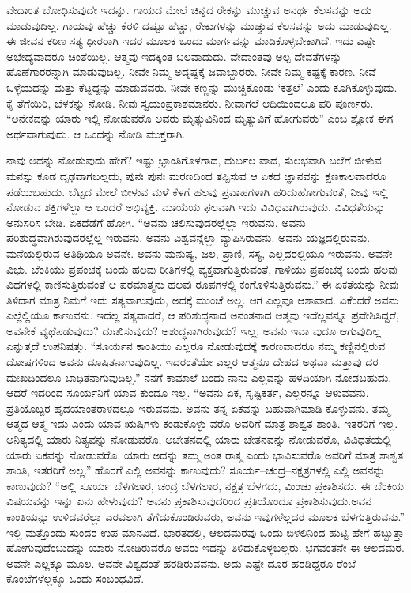 ವೇದಾಂತ ಬೋಧಿಸುವುದೇ ಇದನ್ನು. ಗಾಯದ ಮೇಲೆ ಚಿನ್ನದ ರೇಕನ್ನು ಮುಚ್ಚುವ ಅನರ್ಥ ಕೆಲಸವನ್ನು ಅದು ಮಾಡುವುದಿಲ್ಲ. ಗಾಯವು ಹೆಚ್ಚು ಕೆರಳಿ ದಷ್ಟೂ ಹೆಚ್ಚು, ರೇಕುಗಳನ್ನು ಮುಚ್ಚುವ ಕೆಲಸವನ್ನು ಅದು ಮಾಡುವುದಿಲ್ಲ. ಈ ಜೀವನ ಕಠಿಣ ಸತ್ಯ ಧೀರರಾಗಿ ಇದರ ಮೂಲಕ ಒಂದು ಮಾರ್ಗವನ್ನು ಮಾಡಿಕೊಳ್ಳಬೇಕಾಗಿದೆ. ಇದು ಎಷ್ಟೇ ಅಭೇದ್ಯವಾದರೂ ಚಿಂತೆಯಿಲ್ಲ. ಆತ್ಮವು ಇದಕ್ಕಿಂತ ಬಲವಾದುದು. ವೇದಾಂತವು ಅಲ್ಪ ದೇವತೆಗಳನ್ನು ಹೊಣೆಗಾರರನ್ನಾಗಿ ಮಾಡುವುದಿಲ್ಲ. ನೀವೇ ನಿಮ್ಮ ಅದೃಷ್ಟಕ್ಕೆ ಜವಾಬ್ದಾರರು. ನೀವೇ ನಿಮ್ಮ ಕಷ್ಟಕ್ಕೆ ಕಾರಣ. ನೀವೆ ಒಳ್ಳೆಯದನ್ನು ಮತ್ತು ಕೆಟ್ಟದ್ದನ್ನು ಮಾಡುವವರು. ನೀವೇ ಕಣ್ಣನ್ನು ಮುಚ್ಚಿಕೊಂಡು ‘ಕತ್ತಲೆ’ ಎಂದು ಕೂಗಿಕೊಳ್ಳುವುದು. ಕೈ ತೆಗೆಯಿರಿ, ಬೆಳಕನ್ನು ನೋಡಿ. ನೀವು ಸ್ವಯಂಪ್ರಕಾಶಮಾನರು. ನೀವಾಗಲೆ ಆದಿಯಿಂದಲೂ ಪರಿ ಪೂರ್ಣರು. “ಅನೇಕವನ್ನು ಯಾರು ಇಲ್ಲಿ ನೋಡುವರೊ ಅವರು ಮೃತ್ಯುವಿನಿಂದ ಮೃತ್ಯುವಿಗೆ ಹೋಗುವರು” ಎಂಬ ಶ್ಲೋಕ ಈಗ ಅರ್ಥವಾಗುವುದು. ಆ ಒಂದನ್ನು ನೋಡಿ ಮುಕ್ತರಾಗಿ.

ನಾವು ಅದನ್ನು ನೋಡುವುದು ಹೇಗೆ? ಇಷ್ಟು ಭ್ರಾಂತಿಗೊಳಗಾದ, ದುರ್ಬಲ ವಾದ, ಸುಲಭವಾಗಿ ಬಲೆಗೆ ಬೀಳುವ ಮನಸ್ಸು ಕೂಡ ದೃಢವಾಗಬಲ್ಲದು, ಪುನಃ ಪುನಃ ಮರಣದಿಂದ ತಪ್ಪಿಸುವ ಆ ಏಕದ ಜ್ಞಾನವನ್ನು ಕ್ಷಣಕಾಲವಾದರೂ ಪಡೆಯಬಹುದು. ಬೆಟ್ಟದ ಮೇಲೆ ಬೀಳುವ ಮಳೆ ಕೆಳಗೆ ಹಲವು ಪ್ರವಾಹಗಳಾಗಿ ಹರಿದುಹೋಗುವಂತೆ, ನೀವು ಇಲ್ಲಿ ನೋಡುವ ಶಕ್ತಿಗಳೆಲ್ಲಾ ಆ ಒಂದರೆ ಅಭಿವ್ಯಕ್ತಿ. ಮಾಯೆಯ ಫಲವಾಗಿ ಇದು ವಿವಿಧವಾಗಿರುವುದು. ವಿವಿಧತೆಯನ್ನು ಅನುಸರಿಸ ಬೇಡಿ. ಏಕದೆಡೆಗೆ ಹೋಗಿ. “ಅವನು ಚಲಿಸುವುದರಲ್ಲೆಲ್ಲಾ ಇರುವನು. ಅವನು ಪರಿಶುದ್ಧವಾಗಿರುವುದರಲ್ಲೆಲ್ಲ ಇರುವನು. ಅವನು ವಿಶ್ವವನ್ನೆಲ್ಲಾ ವ್ಯಾಪಿಸಿರುವನು. ಅವನು ಯಜ್ಞದಲ್ಲಿರುವನು. ಮನೆಯಲ್ಲಿರುವ ಅತಿಥಿಯೂ ಅವನೇ. ಅವನು ಮನುಷ್ಯ, ಜಲ, ಪ್ರಾಣಿ, ಸಸ್ಯ, ಎಲ್ಲದರಲ್ಲಿಯೂ ಇರುವನು. ಅವನೇ ವಿಭು. ಬೆಂಕಿಯು ಪ್ರಪಂಚಕ್ಕೆ ಬಂದು ಹಲವು ರೀತಿಗಳಲ್ಲಿ ವ್ಯಕ್ತವಾಗುತ್ತಿರುವಂತೆ, ಗಾಳಿಯು ಪ್ರಪಂಚಕ್ಕೆ ಬಂದು ಹಲವು ವಿಧಗಳಲ್ಲಿ ಕಾಣಿಸುತ್ತಿರುವಂತೆ ಆ ಪರಮಾತ್ಮನು ಹಲವು ರೂಪಗಳಲ್ಲಿ ಕಂಗೊಳಿಸುತ್ತಿರುವನು.” ಈ ಏಕತೆಯನ್ನು ನೀವು ತಿಳಿದಾಗ ಮಾತ್ರ ನಿಮಗೆ ಇದು ಸತ್ಯವಾಗುವುದು, ಅದಕ್ಕೆ ಮುಂಚೆ ಅಲ್ಲ. ಆಗ ಎಲ್ಲವೂ ಆಶಾವಾದ. ಏಕೆಂದರೆ ಅವನು ಎಲ್ಲೆಲ್ಲಿಯೂ ಕಾಣುವನು. ಇದೆಲ್ಲ ಸತ್ಯವಾದರೆ, ಆ ಪರಿಶುದ್ಧನಾದ ಅನಂತನಾದ ಆತ್ಮವು ಇದೆಲ್ಲವನ್ನೂ ಪ್ರವೇಶಿಸಿದ್ದರೆ, ಅವನೇಕೆ ವ್ಯಥೆಪಡುವುದು? ದುಃಖಿಸುವುದು? ಅಶುದ್ಧನಾಗಿರುವುದು? ಇಲ್ಲ, ಅವನು ಇವಾ ವುದೂ ಆಗುವುದಿಲ್ಲ ಎನ್ನುತ್ತದೆ ಉಪನಿಷತ್ತು. “ಸೂರ್ಯನ ಕಾಂತಿಯು ಎಲ್ಲರೂ ನೋಡುವುದಕ್ಕೆ ಕಾರಣವಾದರೂ ನಮ್ಮ ಕಣ್ಣಿನಲ್ಲಿರುವ ದೋಷಗಳಿಂದ ಅವನು ದೂಷಿತನಾಗುವುದಿಲ್ಲ. ಇದರಂತೆಯೇ ಎಲ್ಲರ ಆತ್ಮನೂ ದೇಹದ ಅಥವಾ ಮತ್ತಾವು ದರ ದುಃಖದಿಂದಲೂ ಬಾಧಿತನಾಗುವುದಿಲ್ಲ.” ನನಗೆ ಕಾಮಾಲೆ ಬಂದು ನಾನು ಎಲ್ಲವನ್ನು ಹಳದಿಯಾಗಿ ನೋಡಬಹುದು. ಆದರೆ ಇದರಿಂದ ಸೂರ್ಯನಿಗೆ ಯಾವ ಕುಂದೂ ಇಲ್ಲ. “ಅವನು ಏಕ, ಸೃಷ್ಟಿಕರ್ತ, ಎಲ್ಲರನ್ನೂ ಆಳುವವನು. ಪ್ರತಿಯೊಬ್ಬರ ಹೃದಯಾಂತರಾಳದಲ್ಲೂ ಇರುವವನು. ಅವನು ತನ್ನ ಏಕವನ್ನು ಬಹುವಾಗಿಮಾಡಿ ಕೊಳ್ಳುವನು. ತಮ್ಮ ಆತ್ಮದ ಆತ್ಮ ಇದು ಎಂದು ಯಾವ ಋಷಿಗಳು ಕಂಡುಕೊಳ್ಳು ವರೊ ಅವರಿಗೆ ಮಾತ್ರ ಶಾಶ್ವತ ಶಾಂತಿ. ಇತರರಿಗೆ ಇಲ್ಲ. ಅನಿತ್ಯದಲ್ಲಿ ಯಾರು ನಿತ್ಯವನ್ನು ನೋಡುವರೊ, ಅಚೇತನದಲ್ಲಿ ಯಾರು ಚೇತನವನ್ನು ನೋಡುವರೊ, ವಿವಿಧತೆಯಲ್ಲಿ ಯಾರು ಏಕವನ್ನು ನೋಡುವರೊ, ಯಾರು ಅದನ್ನು ತಮ್ಮ ಅಂತ ರಾತ್ಮ ಎಂದು ಭಾವಿಸುವರೊ ಅವರಿಗೆ ಮಾತ್ರ ಶಾಶ್ವತ ಶಾಂತಿ, ಇತರರಿಗೆ ಅಲ್ಲ.” ಹೊರಗೆ ಎಲ್ಲಿ ಅವನನ್ನು ಕಾಣುವುದು? ಸೂರ್ಯ–ಚಂದ್ರ–ನಕ್ಷತ್ರಗಳಲ್ಲಿ ಎಲ್ಲಿ ಅವನನ್ನು ಕಾಣುವುದು? “ಅಲ್ಲಿ ಸೂರ್ಯ ಬೆಳಗಲಾರ, ಚಂದ್ರ ಬೆಳಗಲಾರ, ನಕ್ಷತ್ರ ಬೆಳಗದು, ಮಿಂಚು ಪ್ರಕಾಶಿಸದು. ಈ ಬೆಂಕಿಯ ವಿಷಯವನ್ನು ಇನ್ನು ಏನು ಹೇಳುವುದು? ಅವನು ಪ್ರಕಾಶಿಸುವುದರಿಂದ ಪ್ರತಿಯೊಂದೂ ಪ್ರಕಾಶಿಸುವುದು.ಅವನ ಕಾಂತಿಯನ್ನು ಉಳಿದವರೆಲ್ಲಾ ಎರವಲಾಗಿ ತೆಗೆದುಕೊಂಡಿರುವರು, ಅವನು ಇವುಗಳೆಲ್ಲದರ ಮೂಲಕ ಬೆಳಗುತ್ತಿರುವನು.” ಇಲ್ಲಿ ಮತ್ತೊಂದು ಸುಂದರ ಉಪ ಮಾನವಿದೆ. ಭಾರತದಲ್ಲಿ, ಆಲದಮರವು ಒಂದು ಬಿಳಲಿನಿಂದ ಹುಟ್ಟಿ ಹೇಗೆ ಹಬ್ಬುತ್ತಾ ಹೋಗುವುದೆಂಬುದನ್ನು ಯಾರು ನೋಡಿರುವರೊ ಅವರು ಇದನ್ನು ತಿಳಿದುಕೊಳ್ಳಬಲ್ಲರು. ಭಗವಂತನೇ ಈ ಆಲದಮರ. ಅವನೇ ಎಲ್ಲಕ್ಕೂ ಮೂಲ. ಅವನೇ ವಿಶ್ವದಂತೆ ಹರಡಿರುವವನು. ಅದು ಎಷ್ಟೇ ದೂರ ಹರಡಿದ್ದರೂ ರೆಂಬೆ ಕೊಂಬೆಗಳೆಲ್ಲಕ್ಕೂ ಒಂದು ಸಂಬಂಧವಿದೆ.

